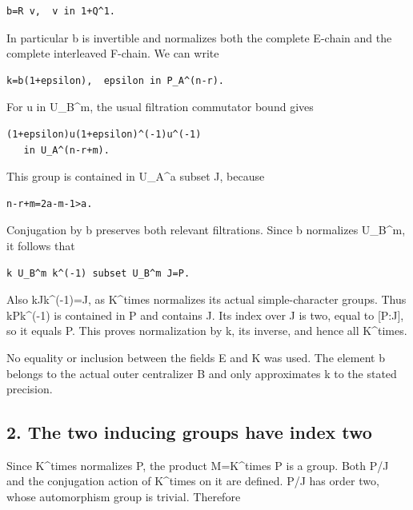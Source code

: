 \begin{Verbatim}[fontsize=\small,breaklines=true,breakanywhere=true]
b=R v,  v in 1+Q^1.
\end{Verbatim}

In particular b is invertible and normalizes both the complete E-chain
and the complete interleaved F-chain. We can write

\begin{Verbatim}[fontsize=\small,breaklines=true,breakanywhere=true]
k=b(1+epsilon),  epsilon in P_A^(n-r).
\end{Verbatim}

For u in U\_B\^{}m, the usual filtration commutator bound gives

\begin{Verbatim}[fontsize=\small,breaklines=true,breakanywhere=true]
(1+epsilon)u(1+epsilon)^(-1)u^(-1)
   in U_A^(n-r+m).
\end{Verbatim}

This group is contained in U\_A\^{}a subset J, because

\begin{Verbatim}[fontsize=\small,breaklines=true,breakanywhere=true]
n-r+m=2a-m-1>a.
\end{Verbatim}

Conjugation by b preserves both relevant filtrations. Since b normalizes
U\_B\^{}m, it follows that

\begin{Verbatim}[fontsize=\small,breaklines=true,breakanywhere=true]
k U_B^m k^(-1) subset U_B^m J=P.
\end{Verbatim}

Also kJk\^{}(-1)=J, as K\^{}times normalizes its actual simple-character
groups. Thus kPk\^{}(-1) is contained in P and contains J. Its index
over J is two, equal to {[}P:J{]}, so it equals P. This proves
normalization by k, its inverse, and hence all K\^{}times.

No equality or inclusion between the fields E and K was used. The
element b belongs to the actual outer centralizer B and only
approximates k to the stated precision.

\hypertarget{rank4_stages-the-two-inducing-groups-have-index-two}{%
\subsection{2. The two inducing groups have index
two}\label{rank4_stages-the-two-inducing-groups-have-index-two}}

Since K\^{}times normalizes P, the product M=K\^{}times P is a group.
Both P/J and the conjugation action of K\^{}times on it are defined. P/J has order two, whose automorphism group is trivial. Therefore

